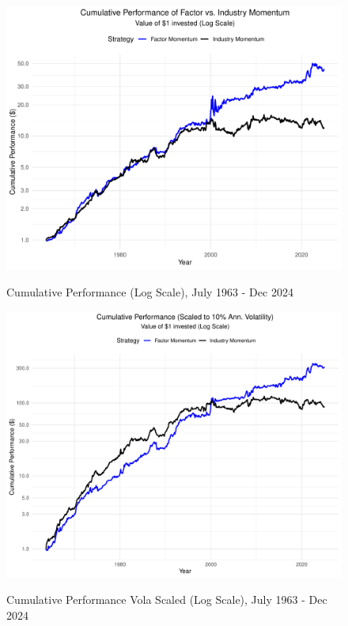 \documentclass[t]{beamer}
\makeatletter
\def\maxwidth{%
  \ifdim\Gin@nat@width>\linewidth
    \linewidth
  \else
    \Gin@nat@width
  \fi
}
\newenvironment{knitrout}{}{}
\makeatother
\begin{document}
\begin{frame}
\begin{knitrout}
\color{fgcolor}
\begin{figure}
{\centering \includegraphics[width=\maxwidth]{figure/cum_ret_plot} }
\caption[Cumulative Performance (Log Scale), July 1963 - Dec 2024]{Cumulative Performance (Log Scale), July 1963 - Dec 2024}
\label{fig:cum_ret_plot}
\end{figure}
\end{knitrout}
\end{frame}

\begin{frame}
\begin{knitrout}
\color{fgcolor}
\begin{figure}
{\centering \includegraphics[width=\maxwidth]{figure/cum_ret_plot_vola_scaled} }
\caption[Cumulative Performance Vola Scaled (Log Scale), July 1963 - Dec 2024]{Cumulative Performance Vola Scaled (Log Scale), July 1963 - Dec 2024}
\label{fig:cum_ret_plot_vola_scaled}
\end{figure}
\end{knitrout}
\end{frame}
\end{document}
